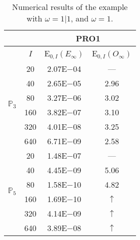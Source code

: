 \begin{table}[H]
\caption{Numerical results of the example with $\omega=1|1$, and $\omega=1$.}
\setlength{\tabcolsep}{5pt}
\centering
\begin{tabular}{@{}l c c c@{}}
\toprule
 &  & \multicolumn{2}{c}{PRO1}\\
\midrule
 & $I$ & E$_{0,I}(E_{\infty})$ & E$_{0,I}(O_{\infty})$\\
\midrule
\multirow{6}{*}{$\mathbb{P}_{3}$}
 & 20 & 2.07E$-$04 & ---\\
 & 40 & 2.65E$-$05 & 2.96\\
 & 80 & 3.27E$-$06 & 3.02\\
 & 160 & 3.82E$-$07 & 3.10\\
 & 320 & 4.01E$-$08 & 3.25\\
 & 640 & 6.71E$-$09 & 2.58\\
\midrule
\multirow{6}{*}{$\mathbb{P}_{5}$}
 & 20 & 1.48E$-$07 & ---\\
 & 40 & 4.45E$-$09 & 5.06\\
 & 80 & 1.58E$-$10 & 4.82\\
 & 160 & 1.69E$-$10 & $\uparrow$\\
 & 320 & 4.14E$-$09 & $\uparrow$\\
 & 640 & 3.89E$-$08 & $\uparrow$\\
\bottomrule
\end{tabular}
\label{Table:PRO:test_01_01_test41_pro1}
\end{table}
